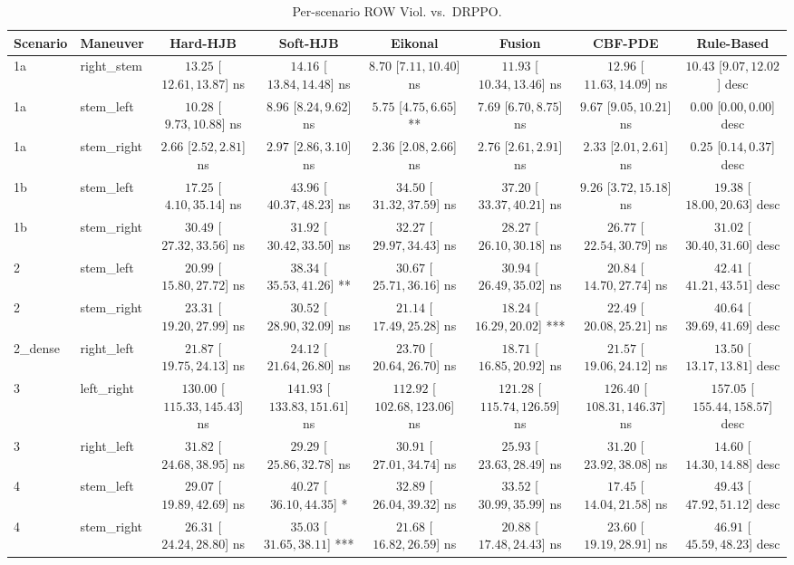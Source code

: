\begin{table}[ht]
\centering
\caption{Per-scenario ROW Viol. vs.\ DRPPO.}
\label{tab:per_scenario_row_violations_per_ep_mean}
\begin{tabular}{llcccccc}
\toprule
Scenario & Maneuver & Hard-HJB & Soft-HJB & Eikonal & Fusion & CBF-PDE & Rule-Based \\
\midrule
1a & right_stem & $13.25$ [$12.61, 13.87$] ns & $14.16$ [$13.84, 14.48$] ns & $8.70$ [$7.11, 10.40$] ns & $11.93$ [$10.34, 13.46$] ns & $12.96$ [$11.63, 14.09$] ns & $10.43$ [$9.07, 12.02$] desc \\
1a & stem_left & $10.28$ [$9.73, 10.88$] ns & $8.96$ [$8.24, 9.62$] ns & $5.75$ [$4.75, 6.65$] ** & $7.69$ [$6.70, 8.75$] ns & $9.67$ [$9.05, 10.21$] ns & $0.00$ [$0.00, 0.00$] desc \\
1a & stem_right & $2.66$ [$2.52, 2.81$] ns & $2.97$ [$2.86, 3.10$] ns & $2.36$ [$2.08, 2.66$] ns & $2.76$ [$2.61, 2.91$] ns & $2.33$ [$2.01, 2.61$] ns & $0.25$ [$0.14, 0.37$] desc \\
1b & stem_left & $17.25$ [$4.10, 35.14$] ns & $43.96$ [$40.37, 48.23$] ns & $34.50$ [$31.32, 37.59$] ns & $37.20$ [$33.37, 40.21$] ns & $9.26$ [$3.72, 15.18$] ns & $19.38$ [$18.00, 20.63$] desc \\
1b & stem_right & $30.49$ [$27.32, 33.56$] ns & $31.92$ [$30.42, 33.50$] ns & $32.27$ [$29.97, 34.43$] ns & $28.27$ [$26.10, 30.18$] ns & $26.77$ [$22.54, 30.79$] ns & $31.02$ [$30.40, 31.60$] desc \\
2 & stem_left & $20.99$ [$15.80, 27.72$] ns & $38.34$ [$35.53, 41.26$] ** & $30.67$ [$25.71, 36.16$] ns & $30.94$ [$26.49, 35.02$] ns & $20.84$ [$14.70, 27.74$] ns & $42.41$ [$41.21, 43.51$] desc \\
2 & stem_right & $23.31$ [$19.20, 27.99$] ns & $30.52$ [$28.90, 32.09$] ns & $21.14$ [$17.49, 25.28$] ns & $18.24$ [$16.29, 20.02$] *** & $22.49$ [$20.08, 25.21$] ns & $40.64$ [$39.69, 41.69$] desc \\
2_dense & right_left & $21.87$ [$19.75, 24.13$] ns & $24.12$ [$21.64, 26.80$] ns & $23.70$ [$20.64, 26.70$] ns & $18.71$ [$16.85, 20.92$] ns & $21.57$ [$19.06, 24.12$] ns & $13.50$ [$13.17, 13.81$] desc \\
3 & left_right & $130.00$ [$115.33, 145.43$] ns & $141.93$ [$133.83, 151.61$] ns & $112.92$ [$102.68, 123.06$] ns & $121.28$ [$115.74, 126.59$] ns & $126.40$ [$108.31, 146.37$] ns & $157.05$ [$155.44, 158.57$] desc \\
3 & right_left & $31.82$ [$24.68, 38.95$] ns & $29.29$ [$25.86, 32.78$] ns & $30.91$ [$27.01, 34.74$] ns & $25.93$ [$23.63, 28.49$] ns & $31.20$ [$23.92, 38.08$] ns & $14.60$ [$14.30, 14.88$] desc \\
4 & stem_left & $29.07$ [$19.89, 42.69$] ns & $40.27$ [$36.10, 44.35$] * & $32.89$ [$26.04, 39.32$] ns & $33.52$ [$30.99, 35.99$] ns & $17.45$ [$14.04, 21.58$] ns & $49.43$ [$47.92, 51.12$] desc \\
4 & stem_right & $26.31$ [$24.24, 28.80$] ns & $35.03$ [$31.65, 38.11$] *** & $21.68$ [$16.82, 26.59$] ns & $20.88$ [$17.48, 24.43$] ns & $23.60$ [$19.19, 28.91$] ns & $46.91$ [$45.59, 48.23$] desc \\
\bottomrule
\end{tabular}
\end{table}
